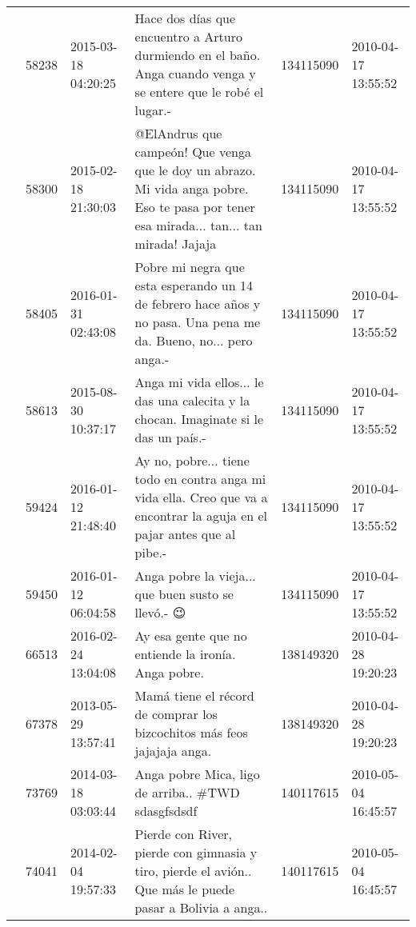 \begin{tabular}{llllrl}
           & 58238   & 2015-03-18 04:20:25 &                              Hace dos días que encuentro a Arturo durmiendo en el baño. Anga cuando venga y se entere que le robé el lugar.- &   134115090 & 2010-04-17 13:55:52 \\
           & 58300   & 2015-02-18 21:30:03 &     @ElAndrus que campeón! Que venga que le doy un abrazo. Mi vida anga pobre. Eso te pasa por tener esa mirada... tan... tan mirada! Jajaja &   134115090 & 2010-04-17 13:55:52 \\
           & 58405   & 2016-01-31 02:43:08 &                             Pobre mi negra que esta esperando un 14 de febrero hace años y no pasa. Una pena me da. Bueno, no... pero anga.- &   134115090 & 2010-04-17 13:55:52 \\
           & 58613   & 2015-08-30 10:37:17 &                                                         Anga mi vida ellos... le das una calecita y la chocan. Imaginate si le das un país.- &   134115090 & 2010-04-17 13:55:52 \\
           & 59424   & 2016-01-12 21:48:40 &                     Ay no, pobre... tiene todo en contra anga mi vida ella. Creo que va a encontrar la aguja en el pajar antes que al pibe.- &   134115090 & 2010-04-17 13:55:52 \\
           & 59450   & 2016-01-12 06:04:58 &                                                                                           Anga pobre la vieja... que buen susto se llevó.- 😉 &   134115090 & 2010-04-17 13:55:52 \\
           & 66513   & 2016-02-24 13:04:08 &                                                                                          Ay esa gente que no entiende la ironía. Anga pobre. &   138149320 & 2010-04-28 19:20:23 \\
           & 67378   & 2013-05-29 13:57:41 &                                                                      Mamá tiene el récord de comprar los bizcochitos más feos jajajaja anga. &   138149320 & 2010-04-28 19:20:23 \\
           & 73769   & 2014-03-18 03:03:44 &                                                                                           Anga pobre Mica, ligo de arriba.. \#TWD sdasgfsdsdf &   140117615 & 2010-05-04 16:45:57 \\
           & 74041   & 2014-02-04 19:57:33 &                                    Pierde con River, pierde con gimnasia y tiro, pierde el avión.. Que más le puede pasar a Bolivia a anga.. &   140117615 & 2010-05-04 16:45:57 \\

\end{tabular}
